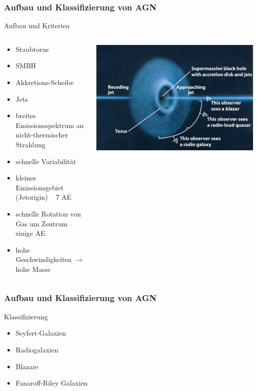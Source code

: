 \documentclass[aspectratio=1610, 9pt]{beamer}
\begin{document}
\begin{frame}\frametitle{Aufbau und Klassifizierung von AGN}
  \begin{block}{Aufbau und Kriterien}
  \begin{columns}
  \begin{column}[c]{0.45\textwidth}
  \begin{itemize}
    \item Staubtorus
    \item SMBH
    \item Akkretions-Scheibe
    \item Jets
    \item breites Emissionsspektrum an nicht-thermischer Strahlung
    \item schnelle Variabilit\"at
    \item kleines Emissionsgebiet (Jetorigin) ~ 7 AE
    \item schnelle Rotation von Gas um Zentrum ~ einige AE
    \item hohe Geschwindigkeiten $\to$ hohe Masse %
  \end{itemize}
  \end{column}
  \begin{column}[c]{0.45\textwidth}
    \includegraphics{images/agn-pic.png}
  \end{column}
  \end{columns}
  \end{block}
\end{frame}

\begin{frame}\frametitle{Aufbau und Klassifizierung von AGN}
  \begin{block}{Klassifizierung}
    \begin{itemize}
      \item Seyfert-Galaxien
      \item Radiogalaxien
      \item Blazare
      \item Fanaroff-Riley Galaxien
    \end{itemize}
  \end{block}
\end{frame}
\end{document}
